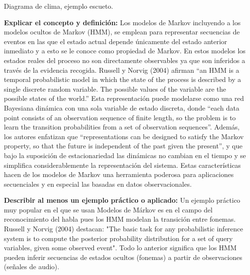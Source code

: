 \documentclass[letterpaper,12pt]{article}
\begin{document}
\begin{itemize}
    \begin{center}
    \end{center}
    \begin{center}
        Diagrama de clima, ejemplo escueto.
    \end{center}
    
    \textbf{Explicar el concepto y definición:}
    Los modelos de Markov incluyendo a los modelos ocultos de Markov (HMM), se emplean para representar secuencias de eventos en las que el estado actual depende únicamente del estado anterior inmediato y a esto se le conoce como propiedad de Markov. 
En estos modelos los estados reales del proceso no son directamente observables ya que son inferidos a través de la evidencia recogida. Russell y Norvig (2004) afirman “an HMM is a temporal probabilistic model in which the state of the process is described by a single discrete random variable. The possible values of the variable are the possible states of the world.” Esta representación puede modelarse como una red Bayesiana dinámica con una sola variable de estado discreta, donde “each data point consists of an observation sequence of finite length, so the problem is to learn the transition probabilities from a set of observation sequences”. Además, los autores enfatizan que “representations can be designed to satisfy the Markov property, so that the future is independent of the past given the present”, y que bajo la suposición de estacionariedad las dinámicas no cambian en el tiempo y se simplifica considerablemente la representación del sistema. Estas características hacen de los modelos de Markov una herramienta poderosa para aplicaciones secuenciales y en especial las basadas en datos observacionales.

    \textbf{Describir al menos un ejemplo práctico o aplicado:}
    Un ejemplo práctico muy popular en el que se usan Modelos de Márkov es en el campo del reconocimiento del habla pues los HMM modelan la transición entre fonemas. Russell y Norvig (2004) destacan: "The basic task for any probabilistic inference system is to compute the posterior probability distribution for a set of query variables, given some observed event".
Todo lo anterior significa que los HMM pueden inferir secuencias de estados ocultos (fonemas) a partir de observaciones (señales de audio).


\end{itemize}
\end{document}
